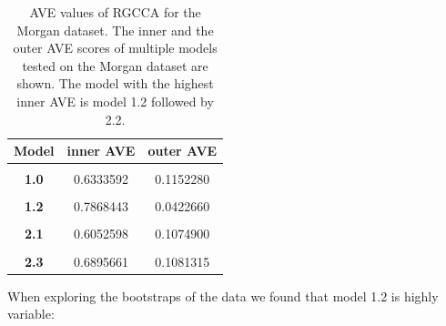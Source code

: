 \documentclass[
  12pt,
  a4paper,
  twoside,
  openright]{book}
\begin{document}
\begin{table}[H]

\caption[AVE values of RGCCA for the Morgan dataset.]{\label{tab:morgan-models-ave}AVE values of RGCCA for the Morgan dataset. The inner and the outer AVE scores of multiple models tested on the Morgan dataset are shown. The model with the highest inner AVE is model 1.2 followed by 2.2.}
\centering
\begin{tabular}[t]{>{}c|c|c}
\hline
\textbf{Model} & \textbf{inner AVE} & \textbf{outer AVE}\\
\hline
\textbf{\cellcolor{gray!6}{0.0}} & \cellcolor{gray!6}{0.4735601} & \cellcolor{gray!6}{0.1098639}\\
\hline
\textbf{1.0} & 0.6333592 & 0.1152280\\
\hline
\textbf{\cellcolor{gray!6}{1.1}} & \cellcolor{gray!6}{0.2448234} & \cellcolor{gray!6}{0.1104746}\\
\hline
\textbf{1.2} & 0.7868443 & 0.0422660\\
\hline
\textbf{\cellcolor{gray!6}{2.0}} & \cellcolor{gray!6}{0.4404123} & \cellcolor{gray!6}{0.1088730}\\
\hline
\textbf{2.1} & 0.6052598 & 0.1074900\\
\hline
\textbf{\cellcolor{gray!6}{2.2}} & \cellcolor{gray!6}{0.6895661} & \cellcolor{gray!6}{0.1081315}\\
\hline
\textbf{2.3} & 0.6895661 & 0.1081315\\
\hline
\end{tabular}
\end{table}

When exploring the bootstraps of the data we found that model 1.2 is highly variable:
\end{document}
